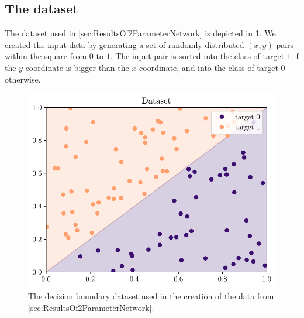 \subsection{The dataset}
The dataset used in \cref{sec:ResultsOf2ParameterNetwork} is depicted in \cref{fig:DB dataset}. We created the input data by generating a set of randomly distributed $(x,y)$ pairs within the square from $0$ to $1$. The input pair is sorted into the class of target $1$ if the $y$ coordinate is bigger than the $x$ coordinate, and into the class of target $0$ otherwise.
\begin{figure}
	\centering
	\includegraphics{Experiment2/plots/Dataset.pdf}
	\caption{The decision boundary dataset used in the creation of the data from \cref{sec:ResultsOf2ParameterNetwork}.}
	\label{fig:DB dataset}
\end{figure}

